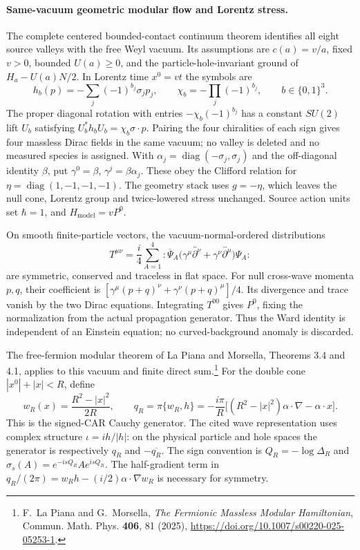\paragraph{Same-vacuum geometric modular flow and Lorentz stress.}
The complete centered bounded-contact continuum theorem identifies all
eight source valleys with the free Weyl vacuum. Its assumptions are
$c(a)=v/a$, fixed $v>0$, bounded $U(a)\geq0$, and the particle-hole-invariant
ground of $H_a-U(a)N/2$. In Lorentz time $x^0=vt$ the symbols are
\[
 h_b(p)=-\sum_j(-1)^{b_j}\sigma_jp_j,
 \qquad \chi_b=-\prod_j(-1)^{b_j},\qquad b\in\{0,1\}^3.
\]
The proper diagonal rotation with entries $-\chi_b(-1)^{b_j}$ has a
constant $SU(2)$ lift $U_b$ satisfying
$U_b^*h_bU_b=\chi_b\sigma\cdot p$. Pairing the four chiralities of each
sign gives four massless Dirac fields in the same vacuum; no valley is
deleted and no measured species is assigned. With
$\alpha_j=\operatorname{diag}(-\sigma_j,\sigma_j)$ and the off-diagonal
identity $\beta$, put $\gamma^0=\beta$, $\gamma^j=\beta\alpha_j$.
These obey the Clifford relation for $\eta=\operatorname{diag}(1,-1,-1,-1)$.
The geometry stack uses $g=-\eta$, which leaves the null cone, Lorentz
group and twice-lowered stress unchanged. Source action units set
$\hbar=1$, and $H_{\mathrm{model}}=vP^0$.

On smooth finite-particle vectors, the vacuum-normal-ordered distributions
\[
 T^{\mu\nu}=\frac{i}{4}\sum_{A=1}^4
 :\overline\Psi_A\bigl(\gamma^\mu
 \overleftrightarrow{\partial^{\nu}}+
 \gamma^\nu\overleftrightarrow{\partial^{\mu}}\bigr)\Psi_A:
\]
are symmetric, conserved and traceless in flat space. For null cross-wave
momenta $p,q$, their coefficient is
$[\gamma^\mu(p+q)^\nu+\gamma^\nu(p+q)^\mu]/4$.
Its divergence and trace vanish by the two Dirac equations. Integrating
$T^{00}$ gives $P^0$, fixing the normalization from the actual propagation
generator. Thus the Ward identity is independent of an Einstein equation;
no curved-background anomaly is discarded.

The free-fermion modular theorem of La Piana and Morsella, Theorems 3.4
and 4.1, applies to this vacuum and finite direct sum.\footnote{F.~La Piana
and G.~Morsella, \emph{The Fermionic Massless Modular Hamiltonian},
Commun. Math. Phys. \textbf{406}, 81 (2025),
\url{https://doi.org/10.1007/s00220-025-05253-1}.}
For the double cone $|x^0|+|x|<R$, define
\[
 w_R(x)=\frac{R^2-|x|^2}{2R},\qquad
 q_R=\pi\{w_R,h\}
 =-\frac{i\pi}{R}\bigl[(R^2-|x|^2)\alpha\cdot\nabla
                         -\alpha\cdot x\bigr].
\]
This is the signed-CAR Cauchy generator. The cited wave representation
uses complex structure $\iota=ih/|h|$: on the physical particle and hole
spaces the generator is respectively $q_R$ and $-\overline{q_R}$.
The sign convention is $Q_R=-\log\Delta_R$ and
$\sigma_s(A)=e^{-isQ_R}Ae^{isQ_R}$.
The half-gradient term in
$q_R/(2\pi)=w_Rh-(i/2)\alpha\cdot\nabla w_R$ is necessary for symmetry.

